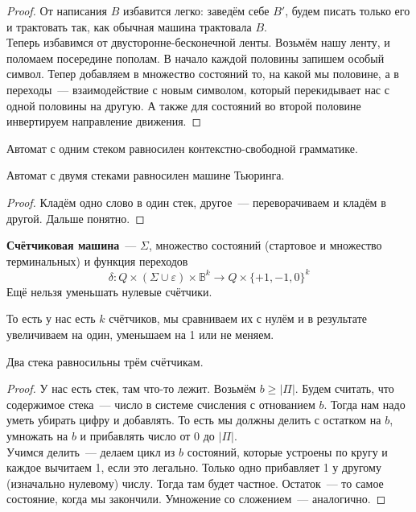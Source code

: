 \documentclass{article}
\begin{document}
    \begin{proof}
        От написания $B$ избавится легко: заведём себе $B'$, будем писать только его и трактовать так, как обычная машина трактовала $B$.\\
        Теперь избавимся от двусторонне-бесконечной ленты. Возьмём нашу ленту, и поломаем посередине пополам. В начало каждой половины запишем особый символ. Тепер добавляем в множество состояний то, на какой мы половине, а в переходы~--- взаимодействие с новым символом, который перекидывает нас с одной половины на другую. А также для состояний во второй половине инвертируем направление движения.
    \end{proof}
    \begin{claim}
        Автомат с одним стеком равносилен контекстно-свободной грамматике.
    \end{claim}
    \begin{claim}
        Автомат с двумя стеками равносилен машине Тьюринга.
    \end{claim}
    \begin{proof}
        Кладём одно слово в один стек, другое~--- переворачиваем и кладём в другой. Дальше понятно.
    \end{proof}
    \begin{definition}
        \textbf{Счётчиковая машина}~--- $\Sigma$, множество состояний (стартовое и множество терминальных) и функция переходов
        $$
        \delta\colon Q\times(\Sigma\cup\varepsilon)\times\mathbb B^k\to Q\times\{+1,-1,0\}^k
        $$
        Ещё нельзя уменьшать нулевые счётчики.
    \end{definition}
    \begin{remark}
        То есть у нас есть $k$ счётчиков, мы сравниваем их с нулём и в результате увеличиваем на один, уменьшаем на 1 или не меняем.
    \end{remark}
    \begin{claim}
        Два стека равносильны трём счётчикам.
    \end{claim}
    \begin{proof}
        У нас есть стек, там что-то лежит. Возьмём $b\geqslant |\Pi|$. Будем считать, что содержимое стека~--- число в системе счисления с отнованием $b$. Тогда нам надо уметь убирать цифру и добавлять. То есть мы должны делить с остатком на $b$, умножать на $b$ и прибавлять число от 0 до $|\Pi|$.\\
        Учимся делить~--- делаем цикл из $b$ состояний, которые устроены по кругу и каждое вычитаем 1, если это легально. Только одно прибавляет 1 у другому (изначально нулевому) числу. Тогда там будет частное. Остаток~--- то самое состояние, когда мы закончили. Умножение со сложением~--- аналогично.
    \end{proof}
\end{document}
